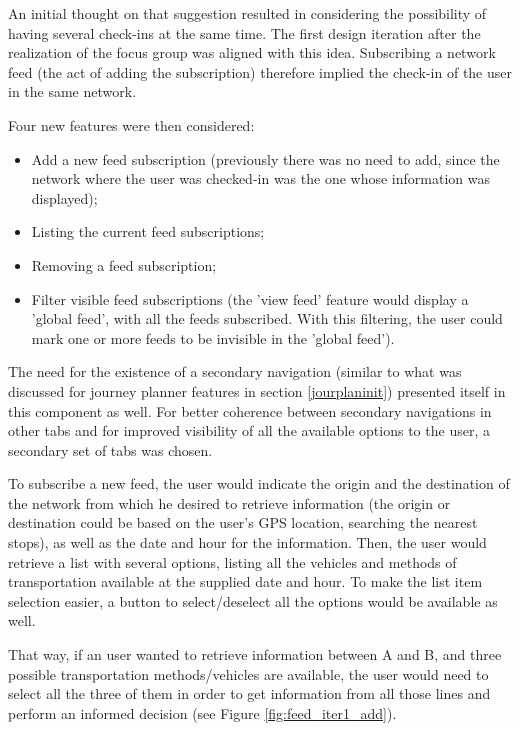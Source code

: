 An initial thought on that suggestion resulted in considering the possibility of having several check-ins at the same time. The first design iteration after the realization of the focus group was aligned with this idea. Subscribing a network feed (the act of adding the subscription) therefore implied the check-in of the user in the same network. 

Four new features were then considered: 

\begin{itemize}
\item Add a new feed subscription (previously there was no need to add, since the network where the user was checked-in was the one whose information was displayed);
\item Listing the current feed subscriptions;
\item Removing a feed subscription;
\item Filter visible feed subscriptions (the 'view feed' feature would display a 'global feed', with all the feeds subscribed. With this filtering, the user could mark one or more feeds to be invisible in the 'global feed').
\end{itemize}

The need for the existence of a secondary navigation (similar to what was discussed for journey planner features in section \ref{jourplaninit}) presented itself in this component as well. For better coherence between secondary navigations in other tabs and for improved visibility of all the available options to the user, a secondary set of tabs was chosen.

To subscribe a new feed, the user would indicate the origin and the destination of the network from which he desired to retrieve information (the origin or destination could be based on the user's GPS location, searching the nearest stops), as well as the date and hour for the information. 
Then, the user would retrieve a list with several options, listing all the vehicles and methods of transportation available at the supplied date and hour. To make the list item selection easier, a button to select/deselect all the options would be available as well.

That way, if an user wanted to retrieve information between A and B, and three possible transportation methods/vehicles are available, the user would need to select all the three of them in order to get information from all those lines and perform an informed decision (see Figure \ref{fig:feed_iter1_add}).

